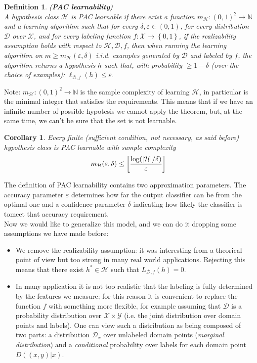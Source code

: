 \documentclass[12pt]{report}
\theoremstyle{plain}
\newtheorem{DEF}{Definition}
\newtheorem{COR}{Corollary}
\newcommand\mcl[1]{\mathcal{#1}}
\begin{document}
\begin{flushleft}
\begin{DEF}
(\textbf{PAC learnability})\\
A hypothesis class $\mcl{H}$ is PAC learnable if there exist a function $m_\mcl{H}:(0,1)^2\to\mathds{N}$ and a learning algorithm such that for every $\delta,\varepsilon\in(0,1)$, for every distribution $\mcl{D}$ over $\mcl{X}$, and for every labeling function $f:\mcl{X}\to\left\{0,1\right\}$, if the realizability assumption holds with respect to $\mcl{H},\mcl{D},f$, then when running the learning algorithm on $m\geq m_\mcl{H}(\varepsilon,\delta)$ i.i.d. examples generated by $\mcl{D}$ and labeled by $f$, the algorithm returns a hypothesis $h$ such that, with probability $\geq 1-\delta$ (over the choice of examples): $\ell_{\mcl{D},f}(h)\leq\varepsilon$.
\label{def:PAC_learn}
\end{DEF}

Note: $m_\mcl{H}:(0,1)^2\to\mathds{N}$ is the sample complexity of learning $\mcl{H}$, in particular is the minimal integer that satisfies the requirements. This means that if we have an infinite number of possible hypotesis we cannot apply the theorem, but, at the same time, we can't be sure that the set is not learnable.\\

\begin{COR}
Every finite (sufficient condition, not necessary, as said before) hypothesis class is PAC learnable with sample complexity
\[ m_\mcl{H}(\varepsilon,\delta)\leq\left[ \frac{\log(\abs{\mcl{H}}/\delta)}{\varepsilon} \right] \]
\end{COR}

The definition of PAC learnability contains two approximation parameters. The accuracy parameter $\varepsilon$
 determines how far the output classifier can be from the optimal one and a confidence parameter $\delta$ indicating how likely the classifier is tomeet that accuracy requirement.\\

\vspace{0.5cm}
Now we would like to generalize this model, and we can do it dropping some assumptions we have made before:
\begin{itemize}
\item We remove the realizability assumption: it was interesting from a theorical point of view but too strong in many real world applications. Rejecting this means that there exist $h^*\in\mcl{H}$ such that $L_{\mcl{D},f}(h)=0$.
\item In many application it is not too realistic that the labeling is fully determined by the features we measure; for this reason it is convenient to replace the function $f$ with something more flexible, for example assuming that $\mcl{D}$ is a probability distribution over $\mcl{X}\times\mcl{Y}$ (i.e. the joint distribution over domain points and labels). One can view such a distribution as being composed of two parts: a distribution $\mcl{D}_x$ over unlabeled domain points (\textit{marginal distribution}) and a \textit{conditional} probability over labels for each domain point $D((x,y)|x)$.
\end{itemize}


\end{flushleft}
\end{document}
